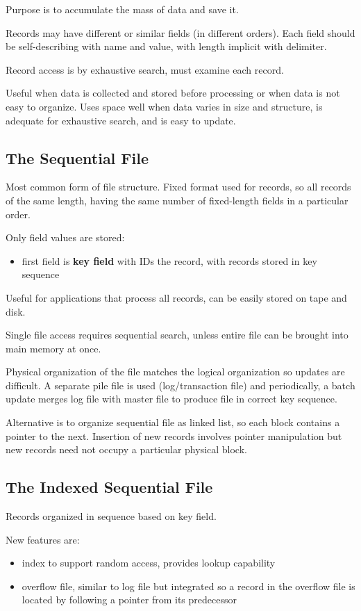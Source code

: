 \documentclass[11pt]{article}
\begin{document}
Purpose is to accumulate the mass of data and save it.

Records may have different or similar fields (in different orders).
Each field should be self-describing with name and value, with length
implicit with delimiter.

Record access is by exhaustive search, must examine each record.

Useful when data is collected and stored before processing or when data is not easy
to organize.
Uses space well when data varies in size and structure, is adequate for exhaustive search,
and is easy to update.
\subsection{The Sequential File}
\label{sec:orgc1d8746}
Most common form of file structure.
Fixed format used for records, so all records of the same length, having the same number
of fixed-length fields in a particular order.

Only field values are stored:
\begin{itemize}
\item first field is \textbf{key field} with IDs the record, with records stored in key sequence
\end{itemize}

Useful for applications that process all records, can be easily stored on tape and disk.

Single file access requires sequential search, unless entire file can be brought into main memory
at once.

Physical organization of the file matches the logical organization so updates are difficult.
A separate pile file is used (log/transaction file) and periodically, a batch update merges log file
with master file to produce file in correct key sequence.

Alternative is to organize sequential file as linked list, so each block contains a pointer to the next.
Insertion of new records involves pointer manipulation but new records need not occupy a particular
physical block.
\subsection{The Indexed Sequential File}
\label{sec:org2870829}
Records organized in sequence based on key field.

New features are:
\begin{itemize}
\item index to support random access, provides lookup capability
\item overflow file, similar to log file but integrated so a record in the overflow file is
located by following a pointer from its predecessor
\end{itemize}
\end{document}
